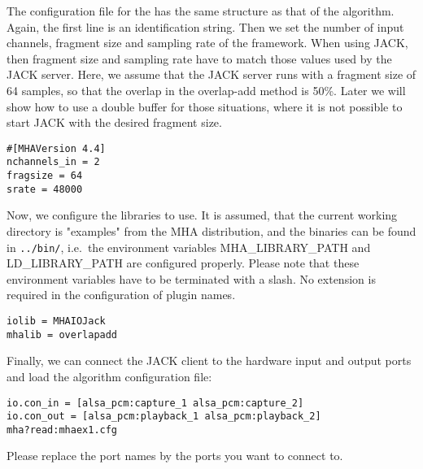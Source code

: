 The configuration file for the \mhad{} has the same structure
as that of the algorithm. Again, the first line is an identification
string. Then we set the number of input channels, fragment size and
sampling rate of the framework. When using JACK, then fragment size
and sampling rate have to match those values used by the JACK server.
Here, we assume that the JACK server runs with a fragment size
of 64 samples, so that the overlap in the overlap-add method is
50\%. Later we will show how to use a double buffer for those
situations, where it is not possible to start JACK with the desired
fragment size.
\begin{verbatim}
#[MHAVersion 4.4]
nchannels_in = 2
fragsize = 64
srate = 48000
\end{verbatim}
Now, we configure the libraries to use.
%
It is assumed, that the current working directory is "examples" from
the MHA distribution, and the binaries can be found in \verb!../bin/!,
i.e.\ the environment variables MHA\_LIBRARY\_PATH and LD\_LIBRARY\_PATH are configured
properly.
%
Please note that these environment variables have to be
terminated with a slash.
%
No extension is required in the configuration of plugin names.
\begin{verbatim}
iolib = MHAIOJack
mhalib = overlapadd
\end{verbatim}
Finally, we can connect the JACK client to the hardware input and
output ports and load the algorithm configuration file:
\begin{verbatim}
io.con_in = [alsa_pcm:capture_1 alsa_pcm:capture_2]
io.con_out = [alsa_pcm:playback_1 alsa_pcm:playback_2]
mha?read:mhaex1.cfg
\end{verbatim}
Please replace the port names by the ports you want to connect
to.

